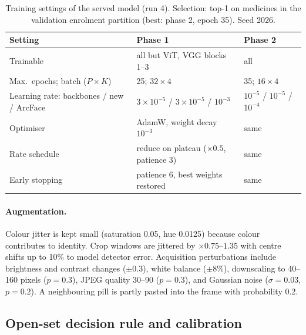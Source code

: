 \begin{table}[!htbp]
  \caption{Training settings of the served model (run 4). Selection: top-1 on medicines in the validation enrolment partition (best:
    phase 2, epoch 35). Seed 2026.}
  \label{tab:train}
  \centering
  \small
  \begin{tabular}{@{}lll@{}}
    \toprule
    Setting & Phase 1 & Phase 2 \\
    \midrule
    Trainable & all but ViT, VGG blocks 1--3 & all \\
    Max.\ epochs; batch ($P\times K$) & 25; $32\times4$ & 35; $16\times4$ \\
    Learning rate: backbones / new / ArcFace & $3\!\times\!10^{-5}$ / $3\!\times\!10^{-5}$ / $10^{-3}$
      & $10^{-5}$ / $10^{-5}$ / $10^{-4}$ \\
    Optimiser & AdamW, weight decay $10^{-3}$ & same \\
    Rate schedule & reduce on plateau ($\times0.5$, patience 3) & same \\
    Early stopping & patience 6, best weights restored & same \\
    \bottomrule
  \end{tabular}
\end{table}

\paragraph{Augmentation.} Colour jitter is kept small (saturation 0.05, hue 0.0125) because colour contributes to identity. Crop windows are jittered by $\times0.75$--$1.35$ with centre shifts up to 10\% to model detector error. Acquisition perturbations include brightness and contrast changes ($\pm0.3$), white balance ($\pm8\%$), downscaling to 40--160 pixels ($p=0.3$), JPEG quality 30--90 ($p=0.3$), and Gaussian noise ($\sigma=0.03$, $p=0.2$). A neighbouring pill is partly pasted into the frame with probability 0.2.

\subsection{Open-set decision rule and calibration}
\label{sec:decision}


